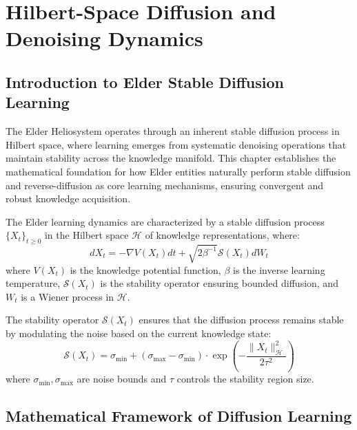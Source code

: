 \chapter{Hilbert-Space Diffusion and Denoising Dynamics}
\label{ch:hilbert_diffusion}

\section{Introduction to Elder Stable Diffusion Learning}

The Elder Heliosystem operates through an inherent stable diffusion process in Hilbert space, where learning emerges from systematic denoising operations that maintain stability across the knowledge manifold. This chapter establishes the mathematical foundation for how Elder entities naturally perform stable diffusion and reverse-diffusion as core learning mechanisms, ensuring convergent and robust knowledge acquisition.

\begin{definition}
The Elder learning dynamics are characterized by a stable diffusion process $\{X_t\}_{t \geq 0}$ in the Hilbert space $\mathcal{H}$ of knowledge representations, where:
\begin{equation}
dX_t = -\nabla V(X_t) dt + \sqrt{2\beta^{-1}} \mathcal{S}(X_t) dW_t
\end{equation}
where $V(X_t)$ is the knowledge potential function, $\beta$ is the inverse learning temperature, $\mathcal{S}(X_t)$ is the stability operator ensuring bounded diffusion, and $W_t$ is a Wiener process in $\mathcal{H}$.
\end{definition}

\begin{definition}
The stability operator $\mathcal{S}(X_t)$ ensures that the diffusion process remains stable by modulating the noise based on the current knowledge state:
\begin{equation}
\mathcal{S}(X_t) = \sigma_{\min} + (\sigma_{\max} - \sigma_{\min}) \cdot \exp\left(-\frac{\|X_t\|_{\mathcal{H}}^2}{2\tau^2}\right)
\end{equation}
where $\sigma_{\min}, \sigma_{\max}$ are noise bounds and $\tau$ controls the stability region size.
\end{definition}

\section{Mathematical Framework of Diffusion Learning}

